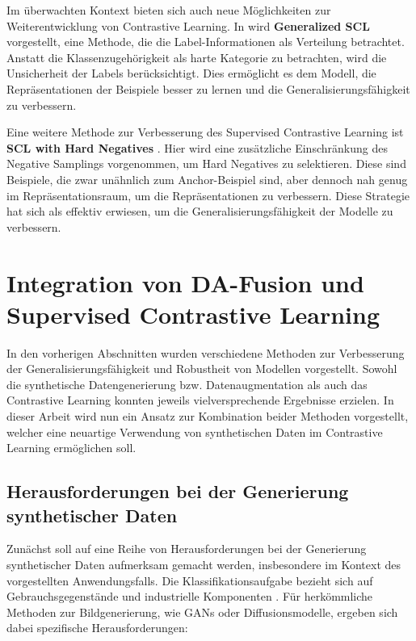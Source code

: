 Im überwachten Kontext bieten sich auch neue Möglichkeiten zur Weiterentwicklung von Contrastive Learning. In \parencite{Kim2023generalizedsupcon} wird \textbf{Generalized SCL} vorgestellt, eine Methode, die die Label-Informationen als Verteilung betrachtet. Anstatt die Klassenzugehörigkeit als harte Kategorie zu betrachten, wird die Unsicherheit der Labels berücksichtigt. Dies ermöglicht es dem Modell, die Repräsentationen der Beispiele besser zu lernen und die Generalisierungsfähigkeit zu verbessern.

Eine weitere Methode zur Verbesserung des Supervised Contrastive Learning ist \textbf{SCL with Hard Negatives} \parencite{Jiang2024supconhardnegatives}. Hier wird eine zusätzliche Einschränkung des Negative Samplings vorgenommen, um Hard Negatives zu selektieren. Diese sind Beispiele, die zwar unähnlich zum Anchor-Beispiel sind, aber dennoch nah genug im Repräsentationsraum, um die Repräsentationen zu verbessern. Diese Strategie hat sich als effektiv erwiesen, um die Generalisierungsfähigkeit der Modelle zu verbessern.

\section{Integration von DA-Fusion und Supervised Contrastive Learning} \label{sec:da-fusion-supcon}

In den vorherigen Abschnitten wurden verschiedene Methoden zur Verbesserung der Generalisierungsfähigkeit und Robustheit von Modellen vorgestellt. Sowohl die synthetische Datengenerierung bzw. Datenaugmentation als auch das Contrastive Learning konnten jeweils vielversprechende Ergebnisse erzielen. In dieser Arbeit wird nun ein Ansatz zur Kombination beider Methoden vorgestellt, welcher eine neuartige Verwendung von synthetischen Daten im Contrastive Learning ermöglichen soll.

\subsection{Herausforderungen bei der Generierung synthetischer Daten} \label{sec:challenges-synt-data}

Zunächst soll auf eine Reihe von Herausforderungen bei der Generierung synthetischer Daten aufmerksam gemacht werden, insbesondere im Kontext des vorgestellten Anwendungsfalls. Die Klassifikationsaufgabe bezieht sich auf Gebrauchsgegenstände und industrielle Komponenten \parencite{Koch2023mvip}. Für herkömmliche Methoden zur Bildgenerierung, wie GANs oder Diffusionsmodelle, ergeben sich dabei spezifische Herausforderungen:

